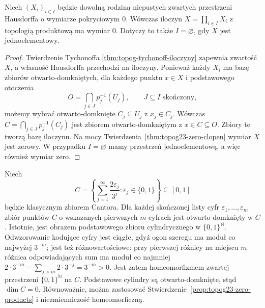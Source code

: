 \begin{stwierdzenie}
\label{prop:topog23-zero-products}
Niech \((X_i)_{i\in I}\) będzie dowolną
rodziną niepustych zwartych przestrzeni
Hausdorffa o wymiarze pokryciowym \(0\).
Wówczas iloczyn
\(X=\prod_{i\in I}X_i\)
z topologią produktową ma wymiar \(0\).
Dotyczy to także \(I=\varnothing\),
gdy \(X\) jest jednoelementowy.
\end{stwierdzenie}
\begin{proof}
Twierdzenie Tychonoffa
\ref{thm:topog-tychonoff-iloczyny}
zapewnia zwartość \(X\),
a własność Hausdorffa przechodzi na iloczyny.
Ponieważ każdy \(X_i\) ma bazę
zbiorów otwarto-domkniętych,
dla każdego punktu \(x\in X\)
i podstawowego otoczenia
\[
 O=\bigcap_{j\in J}p_j^{-1}(U_j),
 \qquad J\subseteq I\text{ skończony},
\]
możemy wybrać otwarto-domknięte
\(C_j\subseteq U_j\) z \(x_j\in C_j\).
Wówczas
\(C=\bigcap_{j\in J}p_j^{-1}(C_j)\)
jest zbiorem otwarto-domkniętym
z \(x\in C\subseteq O\).
Zbiory te tworzą bazę iloczynu.
Na mocy Twierdzenia~\ref{thm:topog23-zero-clopen}
wymiar \(X\) jest zerowy.
W przypadku \(I=\varnothing\)
mamy przestrzeń jednoelementową,
a więc również wymiar zero.
\end{proof}

\begin{przyklad}
\label{ex:topog23-cantor}
Niech
\[
 C=\left\{\sum_{j=1}^{\infty}
          \frac{2\varepsilon_j}{3^j}:
          \varepsilon_j\in\{0,1\}\right\}
 \subseteq[0,1]
\]
będzie klasycznym zbiorem Cantora.
Dla każdej skończonej listy cyfr
\(\varepsilon_1,\ldots,\varepsilon_m\)
zbiór punktów \(C\) o wskazanych
pierwszych \(m\) cyfrach jest
otwarto-domknięty w \(C\).
Istotnie, jest obrazem podstawowego
zbioru cylindrycznego w
\(\{0,1\}^{\mathbb N}\).
Odwzorowanie kodujące cyfry jest ciągłe,
gdyż ogon szeregu ma moduł co najwyżej \(3^{-m}\);
jest też różnowartościowe:
przy pierwszej różnicy na miejscu \(m\)
różnica odpowiadających sum ma moduł
co najmniej
\(2\cdot3^{-m}-\sum_{j>m}2\cdot3^{-j}
=3^{-m}>0\).
Jest zatem homeomorfizmem zwartej przestrzeni
\(\{0,1\}^{\mathbb N}\) na \(C\).
Podstawowe cylindry są otwarto-domknięte,
stąd \(\dim C=0\).
Równoważnie, można zastosować
Stwierdzenie~\ref{prop:topog23-zero-products}
i niezmienniczość homeomorficzną.
\end{przyklad}

